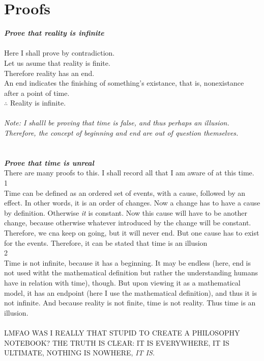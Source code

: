 \documentclass{article}
\begin{document}
\section*{Proofs}
\textit{\textbf{Prove that reality is infinite}}
\\
\\Here I shall prove by contradiction.
\\Let us asume that reality is finite.
\\Therefore reality has an end.
\\An end indicates the finishing of something's existance, that is, nonexistance after a point of time.
\\$\therefore$ Reality is infinite.
\\\\\textit{Note: I shalll be proving that time is false, and thus perhaps an illusion. Therefore, the concept of beginning and end are out of question themselves.}
\\
\\
\\
\textit{\textbf{Prove that time is unreal}}
\\There are many proofs to this. I shall record all that I am aware of at this time.
\\1
\\Time can be defined as an ordered set of events, with a cause, followed by an effect. In other words, it is an order of changes. Now a change has to have a cause by definition. Otherwise \textit{it} is constant. Now this cause will have to be another change, because otherwise whatever introduced by the change will be constant. Therefore, we cna keep on going, but it will never end. But one cause has to exist for the events. Therefore, it can be stated that time is an illusion
\\2
\\Time is not infinite, because it has a beginning. It may be endless (here, end is not used witht the mathematical definition but rather the understanding humans have in relation with time), though. But upon viewing it as a mathematical model, it has an endpoint (here I use the mathematical definition), and thus it is not infinite. And because reality is not finite, time is not reality. Thus time is an illusion.
\\\\LMFAO WAS I REALLY THAT STUPID TO CREATE A PHILOSOPHY NOTEBOOK? THE TRUTH IS CLEAR: IT IS EVERYWHERE, IT IS ULTIMATE, NOTHING IS NOWHERE, \textit{IT IS.}
\end{document}

